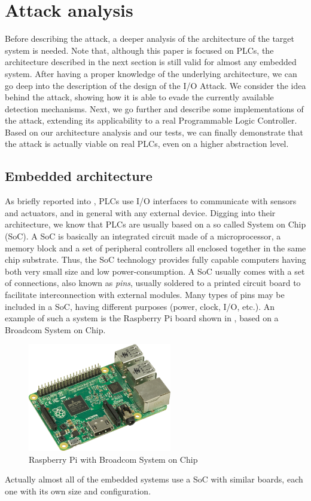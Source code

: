 \chapter{Attack analysis}
\label{chap:attack}

Before describing the attack, a deeper analysis of the architecture of the target system is needed.
Note that, although this paper is focused on PLCs, the architecture described in the next section is still valid for almost any embedded system.
After having a proper knowledge of the underlying architecture, we can go deep into the description of the design of the I/O Attack.
We consider the idea behind the attack, showing how it is able to evade the currently available detection mechanisms.
Next, we go further and describe some implementations of the attack, extending its applicability to a real Programmable Logic Controller.
Based on our architecture analysis and our tests, we can finally demonstrate that the attack is actually viable on real PLCs, even on a higher abstraction level.


\section{Embedded architecture}
\label{sec:embed-arch}

As briefly reported into , PLCs use I/O interfaces to communicate with sensors and actuators, and in general with any external device.
Digging into their architecture, we know that PLCs are usually based on a so called System on Chip (SoC).
A SoC is basically an integrated circuit made of a microprocessor, a memory block and a set of peripheral controllers all enclosed together in the same chip substrate.
Thus, the SoC technology provides fully capable computers having both very small size and low power-consumption.
A SoC usually comes with a set of connections, also known as \emph{pins}, usually soldered to a printed circuit board to facilitate interconnection with external modules.
Many types of pins may be included in a SoC, having different purposes (power, clock, I/O, etc.).
An example of such a system is the Raspberry Pi board shown in , based on a Broadcom System on Chip.
\begin{figure}[h]
\centerline{\includegraphics[width=0.56\textwidth]{res/raspberry}}
\caption{Raspberry Pi \cite{raspberry} with Broadcom System on Chip \label{fig:raspberry}}
\end{figure}
Actually almost all of the embedded systems use a SoC with similar boards, each one with its own size and configuration.


